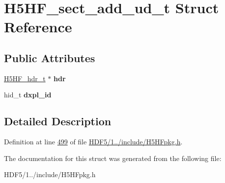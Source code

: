 \hypertarget{struct_h5_h_f__sect__add__ud__t}{}\section{H5\+H\+F\+\_\+sect\+\_\+add\+\_\+ud\+\_\+t Struct Reference}
\label{struct_h5_h_f__sect__add__ud__t}
\subsection*{Public Attributes}
\begin{DoxyCompactItemize}
\item 
\mbox{\label{struct_h5_h_f__sect__add__ud__t_a5f8b92c4952cc31ac5f066fe75f48740}} 
\hyperlink{struct_h5_h_f__hdr__t}{H5\+H\+F\+\_\+hdr\+\_\+t} $\ast$ {\bfseries hdr}
\item 
\mbox{\label{struct_h5_h_f__sect__add__ud__t_a904d6ef159bda5e2976db41e85dc7c21}} 
hid\+\_\+t {\bfseries dxpl\+\_\+id}
\end{DoxyCompactItemize}


\subsection{Detailed Description}


Definition at line \hyperlink{_h_d_f5_21_810_81_2include_2_h5_h_fpkg_8h_source_l00499}{499} of file \hyperlink{_h_d_f5_21_810_81_2include_2_h5_h_fpkg_8h_source}{H\+D\+F5/1../include/\+H5\+H\+Fpkg.\+h}.



The documentation for this struct was generated from the following file\+:\begin{DoxyCompactItemize}
\item 
H\+D\+F5/1../include/\+H5\+H\+Fpkg.\+h\end{DoxyCompactItemize}
